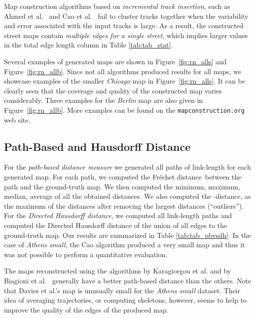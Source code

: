 \documentclass[natbib]{svjour3}                    \smartqed  \usepackage[table]{xcolor}
\newcommand{\Frd}{Fr\'echet distance}
\begin{document}
Map construction algorithms based on \emph{incremental track insertion}, such as Ahmed et al.\ \cite{csm_esa2012} and Cao et al.\ \cite{Cao:2009:GTR:1653771.1653776} fail to cluster tracks together when the variability and error associated with the input tracks is large. As a result, the constructed street maps contain \emph{multiple edges for a single street}, which implies larger values in the total edge length column in Table \ref{tab:tab_stat}.

Several examples of generated maps are shown in Figure~\ref{fig:rn_alls} and Figure~\ref{fig:rn_allb}. Since not all algorithms produced results for all maps, we showcase examples of the smaller \emph{Chicago} map in Figure~\ref{fig:rn_alls}. It can be clearly seen that the coverage and quality of the constructed map varies considerably. Three examples for the \emph{Berlin} map are also given in Figure~\ref{fig:rn_allb}. More examples can be found on the {\tt mapconstruction.org} web site.

\subsection{Path-Based and Hausdorff Distance} 
\label{sub:distance}

For the \emph{path-based distance measure} we generated all paths of link-length  for each generated map. For each path, we computed the \Frd\ between the path and the ground-truth map. We then computed the minimum, maximum, median, average of all the obtained distances. We also computed the -distance, as the maximum of the distances after removing the  largest distances (``outliers'').
For the \emph{Directed Hausdorff distance}, we computed all link-length  paths and computed the Directed Hausdorff distance of the union of all edges to the ground-truth map. Our results are summarized in Table \ref{tab:tab_pbvsdh}. 
In the case of \emph{Athens small}, the Cao algorithm produced a very small map and thus it was not possible to perform a quantitative evaluation. 

The maps reconstructed using the algorithms by Karagiorgou et al. \cite{Karagiorgou:2012:VTD:2424321.2424334} and by  Biagioni et al.\ \cite{be-irmgp-12,Biagioni:2012:MIF:2424321.2424333} generally have a better path-based distance than the others. Note that Davies et al.'s \cite{Davies:2006:SDR:1175887.1176088} map is unusually small for the \emph{Athens small} dataset. Their idea of averaging trajectories, or computing skeletons, however, seems to help to improve the quality of the edges of the produced map. 
\end{document}
